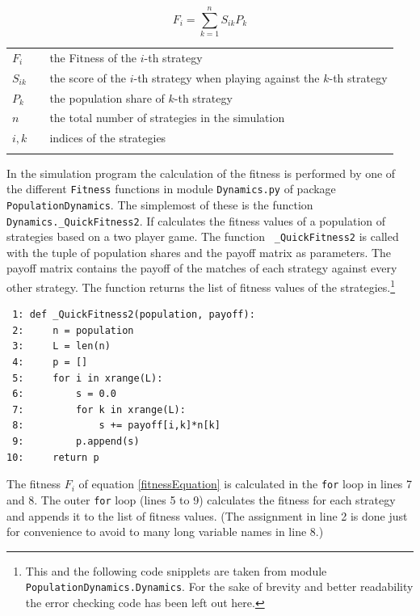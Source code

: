 \begin{equation}
\label{fitnessEquation}
F_i = \sum_{k=1}^n S_{ik}P_k
\end{equation}
\begin{tabular}{lll}
  $F_i$    & &  the Fitness of the $i$-th strategy \\
  $S_{ik}$  & & the score of the $i$-th strategy when playing against
the $k$-th strategy \\
  $P_k$  & & the population share of $k$-th strategy \\
  $n$ & & the total number of strategies in the simulation \\
  $i,k$ & & indices of the strategies \\
& & \\
\end{tabular}

In the simulation program the calculation of the fitness is performed by one
of the different {\tt Fitness} functions in module {\tt Dynamics\-.\-py} of
package {\tt Population\-Dynamics}. The simplemost of these is the function
{\tt Dynamics\-.\-\_Quick\-Fitness2}. If calculates the fitness values of a
population of strategies based on a two player game. The function {\tt
  \_QuickFitness2} is called with the tuple of population shares and the
payoff matrix as parameters. The payoff matrix contains the payoff of the
matches of each strategy against every other strategy. The function returns
the list of fitness values of the strategies.\footnote{This and the following
  code snipplets are taken from module {\tt PopulationDynamics.Dynamics}. For
  the sake of brevity and better readability the error checking code has been
  left out here.}

\begin{scriptsize}
\begin{verbatim}
 1: def _QuickFitness2(population, payoff):
 2:     n = population
 3:     L = len(n)
 4:     p = []
 5:     for i in xrange(L):
 6:         s = 0.0
 7:         for k in xrange(L):
 8:             s += payoff[i,k]*n[k]
 9:         p.append(s)
10:     return p
\end{verbatim}
\end{scriptsize}

The fitness $F_i$ of equation \ref{fitnessEquation} is calculated in
the {\tt for} loop in lines 7 and 8. The outer {\tt for} loop (lines 5
to 9) calculates the fitness for each strategy and appends it to the
list of fitness values. (The assignment in line 2 is done just for
convenience to avoid to many long variable names in line 8.)

